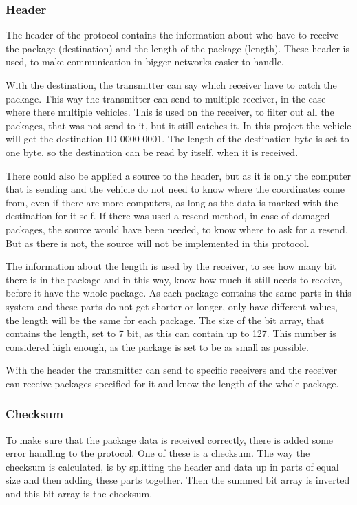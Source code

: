 \subsubsection{Header}
The header of the protocol contains the information about who have to receive the package (destination) and the length of the package (length). These header is used, to make communication in bigger networks easier to handle.

With the destination, the transmitter can say which receiver have to catch the package. This way the transmitter can send to multiple receiver, in the case where there multiple vehicles. This is used on the receiver, to filter out all the packages, that was not send to it, but it still catches it. In this project the vehicle will get the destination ID 0000 0001. The length of the destination byte is set to one byte, so the destination can be read by itself, when it is received.

There could also be applied a source to the header, but as it is only the computer that is sending and the vehicle do not need to know where the coordinates come from, even if there are more computers, as long as the data is marked with the destination for it self. If there was used a resend method, in case of damaged packages, the source would have been needed, to know where to ask for a resend. But as there is not, the source will not be implemented in this protocol.

The information about the length is used by the receiver, to see how many bit there is in the package and in this way, know how much it still needs to receive, before it have the whole package. As each package contains the same parts in this system and these parts do not get shorter or longer, only have different values, the length will be the same for each package. The size of the bit array, that contains the length, set to 7 bit, as this can contain up to 127. This number is considered high enough, as the package is set to be as small as possible.

With the header the transmitter can send to specific receivers and the receiver can receive packages specified for it and know the length of the whole package.

\subsubsection{Checksum}
To make sure that the package data is received correctly, there is added some error handling to the protocol. One of these is a checksum. The way the checksum is calculated, is by splitting the header and data up in parts of equal size and then adding these parts together. Then the summed bit array is inverted and this bit array is the checksum. 

